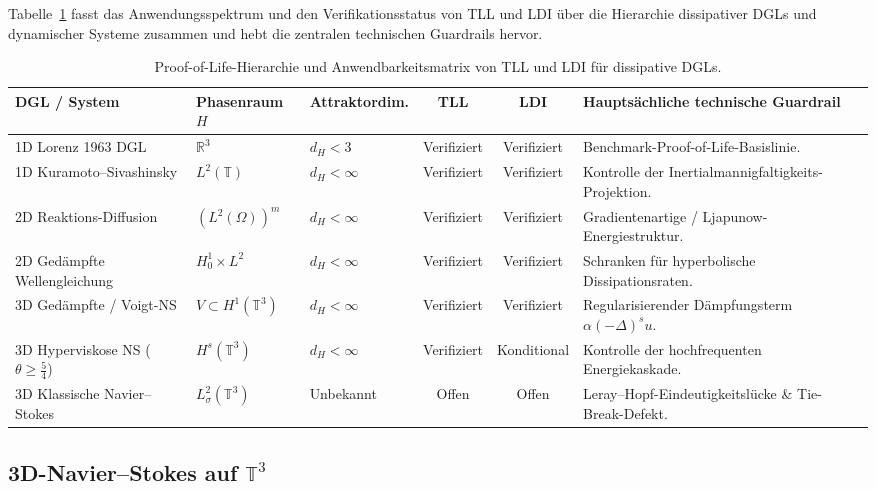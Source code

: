 \documentclass[12pt,a4paper]{article}
\theoremstyle{definition}
\theoremstyle{plain}
\theoremstyle{remark}
\begin{document}
Tabelle~\ref{tab:pde_applications_matrix} fasst das Anwendungsspektrum und den Verifikationsstatus von TLL und LDI über die Hierarchie dissipativer DGLs und dynamischer Systeme zusammen und hebt die zentralen technischen Guardrails hervor.

\begin{table}[htbp]
\centering
\caption{Proof-of-Life-Hierarchie und Anwendbarkeitsmatrix von TLL und LDI für dissipative DGLs.}
\label{tab:pde_applications_matrix}
\vspace{0.2cm}
\footnotesize
\begin{tabularx}{\textwidth}{>{\raggedright\arraybackslash}p{2.5cm} >{\raggedright\arraybackslash}p{1.9cm} >{\raggedright\arraybackslash}p{1.6cm} c c X}
\toprule
\textbf{DGL / System} & \textbf{Phasenraum $H$} & \textbf{Attraktordim.} & \textbf{TLL} & \textbf{LDI} & \textbf{Hauptsächliche technische Guardrail} \\
\midrule
1D Lorenz 1963 DGL & $\mathbb{R}^3$ & $d_H < 3$ & Verifiziert & Verifiziert & Benchmark-Proof-of-Life-Basislinie. \\
1D Kuramoto--Sivashinsky & $L^2(\mathbb{T})$ & $d_H < \infty$ & Verifiziert & Verifiziert & Kontrolle der Inertialmannigfaltigkeits-Projektion. \\
2D Reaktions-Diffusion & $(L^2(\Omega))^m$ & $d_H < \infty$ & Verifiziert & Verifiziert & Gradientenartige / Ljapunow-Energiestruktur. \\
2D Gedämpfte Wellengleichung & $H^1_0 \times L^2$ & $d_H < \infty$ & Verifiziert & Verifiziert & Schranken für hyperbolische Dissipationsraten. \\
3D Gedämpfte / Voigt-NS & $V \subset H^1(\mathbb{T}^3)$ & $d_H < \infty$ & Verifiziert & Verifiziert & Regularisierender Dämpfungsterm $\alpha (-\Delta)^s u$. \\
3D Hyperviskose NS ($\theta \ge \frac{5}{4}$) & $H^s(\mathbb{T}^3)$ & $d_H < \infty$ & Verifiziert & Konditional & Kontrolle der hochfrequenten Energiekaskade. \\
3D Klassische Navier--Stokes & $L^2_\sigma(\mathbb{T}^3)$ & Unbekannt & Offen & Offen & Leray--Hopf-Eindeutigkeitslücke \& Tie-Break-Defekt. \\
\bottomrule
\end{tabularx}
\end{table}

\subsection{3D-Navier--Stokes auf \texorpdfstring{$\mathbb{T}^3$}{T3}}
\end{document}
